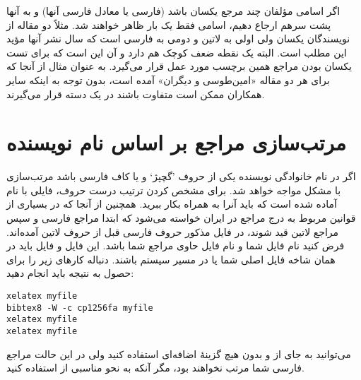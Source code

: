 \documentclass[a4paper]{article}
\theoremstyle{plain}\newtheorem{question}{پرسش}
\begin{document}
اگر اسامی مؤلفان چند مرجع یکسان باشد (فارسی یا معادل فارسی آنها) و  به آنها  پشت سرهم ارجاع دهیم، اسامی فقط یک بار ظاهر خواهند شد. مثلاً \citet{Amintoosi09precise,Amintoosi87afzayesh} دو مقاله از نویسندگان یکسان ولی اولی به لاتین و دومی به فارسی است که سال نشر آنها مؤید این مطلب است. 
 البته یک نقطه ضعف کوچک هم دارد و آن این است که برای تست یکسان بودن مراجع همین برچسب مورد عمل قرار می‌گیرد. به عنوان مثال از آنجا که برای هر دو مقاله «امین‌طوسی و دیگران» آمده است، بدون توجه به اینکه سایر همکاران ممکن است متفاوت باشند در یک دسته قرار می‌گیرند.


\section{مرتب‌سازی مراجع بر اساس نام نویسنده}\label{Sec:sorting}
اگر در نام خانوادگی نویسنده‌ یکی از حروف 'گچپژ` و یا کاف فارسی باشد مرتب‌سازی با مشکل مواجه خواهد شد. برای مشخص کردن ترتیب درست حروف، فایلی با نام  آماده شده است که باید آنرا به همراه  بکار ببرید. همچنین از آنجا که در بسیاری از قوانین مربوط به درج مراجع در ایران خواسته می‌شود که ابتدا مراجع فارسی و سپس مراجع لاتین قید شوند، در فایل مذکور حروف فارسی قبل از حروف لاتین آمده‌اند.
فرض کنید نام فایل شما  و نام فایل حاوی مراجع شما  باشد. این فایل و فایل  باید در همان شاخه فایل اصلی شما یا در مسیر سیستم باشند. 
دنباله کارهای زیر را برای حصول به نتیجه باید انجام دهید:
\begin{LTR}
\begin{verbatim}
xelatex myfile
bibtex8 -W -c cp1256fa myfile
xelatex myfile
xelatex myfile
\end{verbatim}
\end{LTR}
می‌توانید به جای  از {}  و بدون هیچ گزینهٔ اضافه‌ای استفاده کنید ولی در این حالت مراجع فارسی شما مرتب نخواهند بود، مگر آنکه به نحو مناسبی از  استفاده کنید. 
\end{document}
